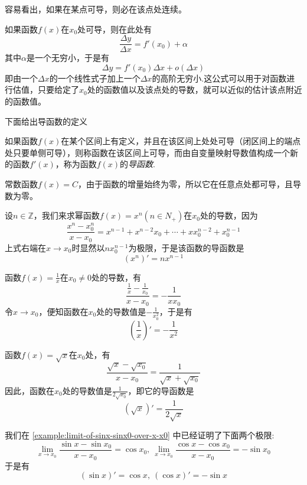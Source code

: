 容易看出，如果在某点可导，则必在该点处连续。

如果函数$f(x)$在$x_0$处可导，则在此处有
\[ \frac{\Delta y}{\Delta x} = f'(x_0)+\alpha \]
其中$\alpha$是一个无穷小，于是有
\[ \Delta y = f'(x_0)\Delta x + o(\Delta x) \]
即由一个$\Delta x$的一个线性式子加上一个$\Delta x$的高阶无穷小.这公式可以用于对函数进行估值，只要给定了$x_0$处的函数值以及该点处的导数，就可以近似的估计该点附近的函数值。

下面给出导函数的定义
\begin{definition}
  如果函数$f(x)$在某个区间上有定义，并且在该区间上处处可导（闭区间上的端点处只要单侧可导），则称函数在该区间上可导，而由自变量映射导数值构成一个新的函数$f'(x)$，称为函数$f(x)$的\emph{导函数}.
\end{definition}

\begin{example}
  常数函数$f(x)=C$，由于函数的增量始终为零，所以它在任意点处都可导，且导数为零。
\end{example}

\begin{example}
  设$n \in \mathbb{Z}$，我们来求幂函数$f(x)=x^n(n \in N_+)$在$x_0$处的导数，因为
  \[ \frac{x^n-x_0^n}{x-x_0} = x^{n-1}+x^{n-2}x_0+\cdots+xx_0^{n-2}+x_0^{n-1} \]
  上式右端在$x \to x_0$时显然以$nx_0^{n-1}$为极限，于是该函数的导函数是
  \[ (x^n)' = nx^{n-1} \]
\end{example}

\begin{example}
  函数$f(x)=\frac{1}{x}$在$x_0 \neq 0$处的导数，有
  \[ \frac{\frac{1}{x}-\frac{1}{x_0}}{x-x_0} = - \frac{1}{xx_0} \]
  令$x \to x_0$，便知函数在$x_0$处的导数值是$-\frac{1}{x_0^2}$，于是有
  \[ \left( \frac{1}{x} \right)' = - \frac{1}{x^2} \]
\end{example}

\begin{example}
  函数$f(x)=\sqrt{x}$在$x_0$处，有
  \[ \frac{\sqrt{x}-\sqrt{x_0}}{x-x_0} = \frac{1}{\sqrt{x}+\sqrt{x_0}} \]
  因此，函数在$x_0$处的导数值是$\frac{1}{2 \sqrt{x_0}}$，即它的导函数是
  \[ \left( \sqrt{x} \right) ' = \frac{1}{2 \sqrt{x}} \]
\end{example}

\begin{example}
 我们在 \autoref{example:limit-of-sinx-sinx0-over-x-x0} 中已经证明了下面两个极限:
  \[ \lim_{x \to x_0} \frac{\sin{x}-\sin{x_0}}{x-x_0} = \cos{x_0}, \  
   \lim_{x \to x_0} \frac{\cos{x}-\cos{x_0}}{x-x_0} = -\sin{x_0} \]
 于是有
 \[ (\sin{x})' = \cos{x}, \  (\cos{x})' = - \sin{x} \]
\end{example}

